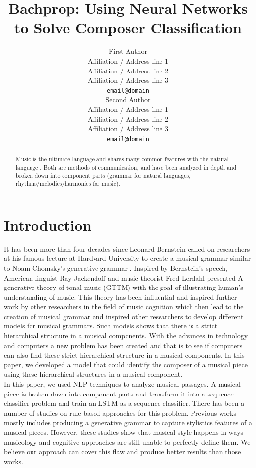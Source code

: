 \documentclass[11pt,a4paper]{article}
\title{Bachprop: Using Neural Networks to Solve Composer Classification}
\author{First Author \\
  Affiliation / Address line 1 \\
  Affiliation / Address line 2 \\
  Affiliation / Address line 3 \\
  {\tt email@domain} \\\And
  Second Author \\
  Affiliation / Address line 1 \\
  Affiliation / Address line 2 \\
  Affiliation / Address line 3 \\
  {\tt email@domain} \\}
\date{}
\begin{document}
\maketitle
\begin{abstract}
Music is the ultimate language and shares many common features with the natural language . Both are methods of communication, and have been analyzed in depth and broken down into component parts (grammar for natural languages, rhythms/melodies/harmonies for music). 
\end{abstract}

\section{Introduction}

It has been more than four decades since Leonard Bernstein called on researchers at his famous lecture at Hardvard University \cite{Bernstein} to create a musical grammar similar to Noam Chomsky's generative grammar \cite{Chomsky}.
Inspired by Bernstein's speech, American linguist Ray Jackendoff and music theorist Fred Lerdahl presented A generative theory of tonal music (GTTM) with the goal of illustrating human's understanding of music. This theory has been influential and inspired further work by other researchers in the field of music cognition which then lead to the creation of musical grammar and inspired other researchers to develop different models for musical grammars. Such models shows that there is a strict hierarchical structure in a musical components. With the advances in technology and computers a new problem has been created and that is to see if computers can also find these strict hierarchical structure in a musical components. In this paper, we developed a model that could identify the composer of a musical piece using these hierarchical structures in a musical component.\\

In this paper, we used NLP techniques to analyze musical passages. A musical piece is broken down into component parts and transform it into a sequence classifier problem and train an LSTM as a sequence classifier. There has been a number of studies on rule based approaches for this problem. Previous works mostly includes producing a generative grammar to capture stylistics features of a musical pieces. However, these studies show that musical style happens in ways musicology and cognitive approaches are still unable to perfectly define them. We believe our approach can cover this flaw and produce better results than those works. \\
\end{document}
